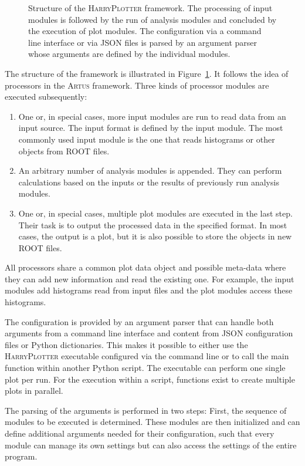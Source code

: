 \documentclass[3p]{elsarticle}
\newcommand{\software}[1]{\textsc{#1}\xspace}
\newcommand{\artus}{\software{Artus}}
\newcommand{\harryplotter}{\software{HarryPlotter}}
\begin{document}
\begin{figure}[htb]
\centering 
\caption{Structure of the \harryplotter framework.
The processing of input modules is followed by the run of analysis modules and concluded by the execution of plot modules.
The configuration via a command line interface or via JSON files is parsed by an argument parser whose arguments are defined by the individual modules.}
\label{figure_artus_harry_plotter}
\end{figure}

The structure of the framework is illustrated in Figure~\ref{figure_artus_harry_plotter}.
It follows the idea of processors in the \artus framework.
Three kinds of processor modules are executed subsequently:
\begin{enumerate}
\item One or, in special cases, more input modules are run to read data from an input source.
The input format is defined by the input module.
The most commonly used input module is the one that reads histograms or other objects from ROOT files.
\item An arbitrary number of analysis modules is appended.
They can perform calculations based on the inputs or the results of previously run analysis modules.
\item One or, in special cases, multiple plot modules are executed in the last step.
Their task is to output the processed data in the specified format.
In most cases, the output is a plot, but it is also possible to store the objects in new ROOT files.
\end{enumerate}
All processors share a common plot data object and possible meta-data where they can add new information and read the existing one.
For example, the input modules add histograms read from input files and the plot modules access these histograms.

The configuration is provided by an argument parser that can handle both arguments from a command line interface and content from JSON configuration files or Python dictionaries.
This makes it possible to either use the \harryplotter executable configured via the command line or to call the main function within another Python script.
The executable can perform one single plot per run.
For the execution within a script, functions exist to create multiple plots in parallel.

The parsing of the arguments is performed in two steps:
First, the sequence of modules to be executed is determined.
These modules are then initialized and can define additional arguments needed for their configuration, such that every module can manage its own settings but can also access the settings of the entire program.
\end{document}
